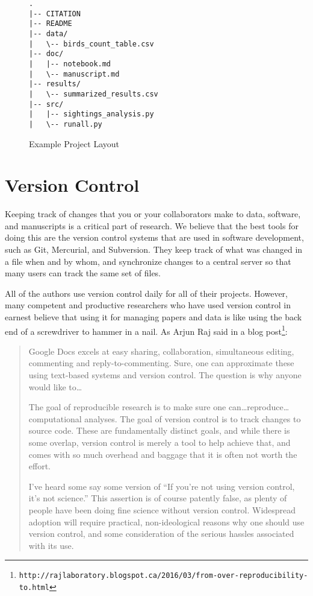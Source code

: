 \documentclass[10pt]{article}
\newcommand{\withurl}[2]{{#1}\footnote{\texttt{#2}}}
\begin{document}
\begin{figure}
\begin{verbatim}
.
|-- CITATION
|-- README
|-- data/
|   \-- birds_count_table.csv
|-- doc/
|   |-- notebook.md
|   \-- manuscript.md
|-- results/
|   \-- summarized_results.csv
|-- src/
|   |-- sightings_analysis.py
|   \-- runall.py
\end{verbatim}
\caption{Example Project Layout}
\label{fig:layout}
\end{figure}

\section{Version Control}\label{sec:versioning}

Keeping track of changes that you or your collaborators make to data,
software, and manuscripts is a critical part of research.  We believe
that the best tools for doing this are the version control systems
that are used in software development, such as Git, Mercurial, and
Subversion.  They keep track of what was changed in a file when and by
whom, and synchronize changes to a central server so that many users
can track the same set of files.

All of the authors use version control daily for all of their
projects.  However, many competent and productive researchers who have
used version control in earnest believe that using it for managing
papers and data is like using the back end of a screwdriver to hammer
in a nail.  As Arjun Raj said in \withurl{a blog
  post}{http://rajlaboratory.blogspot.ca/2016/03/from-over-reproducibility-to.html}:

\begin{quote}
Google Docs excels at easy sharing, collaboration, simultaneous
editing, commenting and reply-to-commenting. Sure, one can approximate
these using text-based systems and version control. The question is
why anyone would like to{\ldots}

The goal of reproducible research is to make sure one
can{\dots}reproduce{\ldots}computational analyses. The goal of version
control is to track changes to source code. These are fundamentally
distinct goals, and while there is some overlap, version control is
merely a tool to help achieve that, and comes with so much overhead
and baggage that it is often not worth the effort.

I've heard some say some version of ``If you're not using version
control, it's not science.'' This assertion is of course patently
false, as plenty of people have been doing fine science without
version control. Widespread adoption will require practical,
non-ideological reasons why one should use version control, and some
consideration of the serious hassles associated with its use.
\end{quote}
\end{document}
